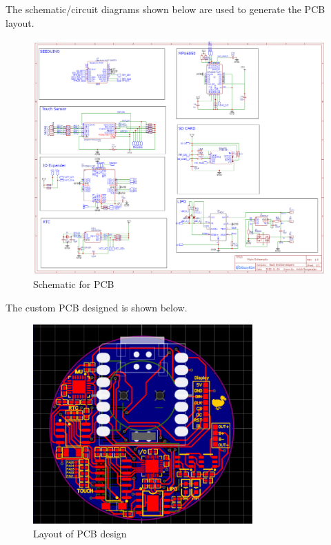 \documentclass[12pt, titlepage]{article}
\begin{document}
The schematic/circuit diagrams shown below are used to generate the PCB layout.

\begin{figure}[H]
	\begin{center}
		 \includegraphics[width=1\textwidth]{Schematic}
		\caption{Schematic for PCB}
		\label{Schematic} 
	\end{center}
\end{figure}

The custom PCB designed is shown below.

\begin{figure}[H]
	\begin{center}
		 \includegraphics[width=0.75\textwidth]{Layout}
		\caption{Layout of PCB design}
		\label{Layout} 
	\end{center}
\end{figure}
\end{document}

